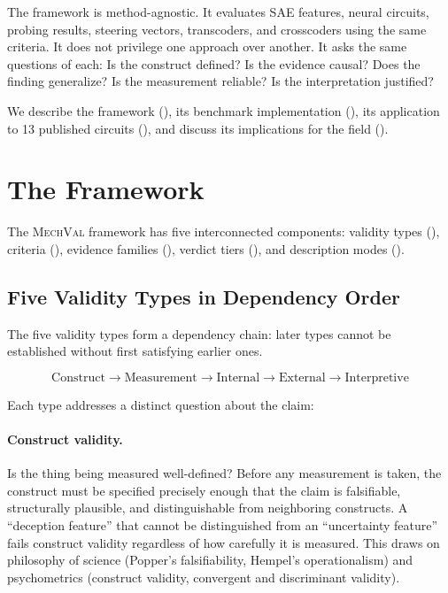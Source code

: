 \documentclass[10pt]{article}
\newcommand{\mechval}{\textsc{MechVal}}
\begin{document}
The framework is method-agnostic. It evaluates SAE features, neural circuits, probing results, steering vectors, transcoders, and crosscoders using the same criteria. It does not privilege one approach over another. It asks the same questions of each: Is the construct defined? Is the evidence causal? Does the finding generalize? Is the measurement reliable? Is the interpretation justified?

We describe the framework (), its benchmark implementation (), its application to 13 published circuits (), and discuss its implications for the field ().

\section{The Framework}
\label{sec:framework}

The \mechval{} framework has five interconnected components: validity types (), criteria (), evidence families (), verdict tiers (), and description modes ().

\subsection{Five Validity Types in Dependency Order}
\label{sec:validity-types}

The five validity types form a dependency chain: later types cannot be established without first satisfying earlier ones.

\begin{equation}
\text{Construct} \rightarrow \text{Measurement} \rightarrow \text{Internal} \rightarrow \text{External} \rightarrow \text{Interpretive}
\label{eq:dependency}
\end{equation}

Each type addresses a distinct question about the claim:

\paragraph{Construct validity.} Is the thing being measured well-defined? Before any measurement is taken, the construct must be specified precisely enough that the claim is falsifiable, structurally plausible, and distinguishable from neighboring constructs. A ``deception feature'' that cannot be distinguished from an ``uncertainty feature'' fails construct validity regardless of how carefully it is measured. This draws on philosophy of science (Popper's falsifiability, Hempel's operationalism) and psychometrics (construct validity, convergent and discriminant validity).
\end{document}
